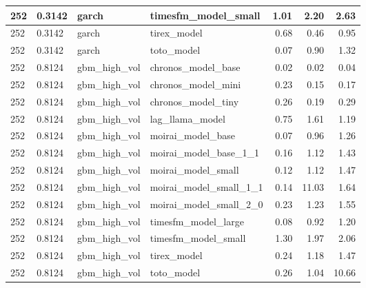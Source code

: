 {\begin{tabular}{llllrrr}
\midrule
252 & 0.3142 & garch & timesfm\_model\_small & 1.01 & 2.20 & 2.63 \\
\midrule
252 & 0.3142 & garch & tirex\_model & 0.68 & 0.46 & 0.95 \\
\midrule
252 & 0.3142 & garch & toto\_model & 0.07 & 0.90 & 1.32 \\
\midrule
252 & 0.8124 & gbm\_high\_vol & chronos\_model\_base & 0.02 & 0.02 & 0.04 \\
\midrule
252 & 0.8124 & gbm\_high\_vol & chronos\_model\_mini & 0.23 & 0.15 & 0.17 \\
\midrule
252 & 0.8124 & gbm\_high\_vol & chronos\_model\_tiny & 0.26 & 0.19 & 0.29 \\
\midrule
252 & 0.8124 & gbm\_high\_vol & lag\_llama\_model & 0.75 & 1.61 & 1.19 \\
\midrule
252 & 0.8124 & gbm\_high\_vol & moirai\_model\_base & 0.07 & 0.96 & 1.26 \\
\midrule
252 & 0.8124 & gbm\_high\_vol & moirai\_model\_base\_1\_1 & 0.16 & 1.12 & 1.43 \\
\midrule
252 & 0.8124 & gbm\_high\_vol & moirai\_model\_small & 0.12 & 1.12 & 1.47 \\
\midrule
252 & 0.8124 & gbm\_high\_vol & moirai\_model\_small\_1\_1 & 0.14 & 11.03 & 1.64 \\
\midrule
252 & 0.8124 & gbm\_high\_vol & moirai\_model\_small\_2\_0 & 0.23 & 1.23 & 1.55 \\
\midrule
252 & 0.8124 & gbm\_high\_vol & timesfm\_model\_large & 0.08 & 0.92 & 1.20 \\
\midrule
252 & 0.8124 & gbm\_high\_vol & timesfm\_model\_small & 1.30 & 1.97 & 2.06 \\
\midrule
252 & 0.8124 & gbm\_high\_vol & tirex\_model & 0.24 & 1.18 & 1.47 \\
\midrule
252 & 0.8124 & gbm\_high\_vol & toto\_model & 0.26 & 1.04 & 10.66 \\
\bottomrule
\end{tabular}
}